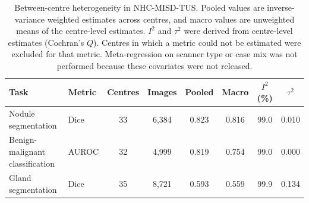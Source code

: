 \documentclass[fleqn,10pt]{wlscirep}
\begin{document}
\begin{appendices}
\begin{table}[p]
\begin{threeparttable}
\caption{Between-centre heterogeneity in NHC-MISD-TUS. Pooled values are inverse-variance weighted estimates across centres, and macro values are unweighted means of the centre-level estimates. $I^2$ and $\tau^2$ were derived from centre-level estimates (Cochran's $Q$). Centres in which a metric could not be estimated were excluded for that metric. Meta-regression on scanner type or case mix was not performed because these covariates were not released.}
\label{tab:nhc_heterogeneity}

\footnotesize
\setlength{\tabcolsep}{5.5pt}
\renewcommand{\arraystretch}{1.08}

\begin{tabular}{llcccccc}
\toprule
\textbf{Task} & \textbf{Metric} & \textbf{Centres} & \textbf{Images} & \textbf{Pooled} & \textbf{Macro} & \textbf{$I^2$ (\%)} & \textbf{$\tau^2$} \\
\midrule
Nodule segmentation & Dice & 33 & 6,384 & 0.823 & 0.816 & 99.0 & 0.010 \\
Benign-malignant classification & AUROC & 32 & 4,999 & 0.819 & 0.754 & 99.0 & 0.000 \\
Gland segmentation & Dice & 35 & 8,721 & 0.593 & 0.559 & 99.9 & 0.134 \\
\bottomrule
\end{tabular}
\end{threeparttable}
\end{table}
\clearpage


\end{appendices}

\clearpage

\end{document}

